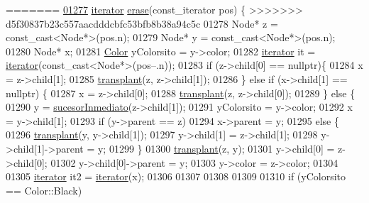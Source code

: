 \begin{DoxyCode}
=======
\hyperlink{classaed2_1_1map_ad8e796bf9c9c558e5ce6b61e116253fe_ad8e796bf9c9c558e5ce6b61e116253fe}{01277}     \hyperlink{classaed2_1_1iterator}{iterator} \hyperlink{classaed2_1_1map_ad8e796bf9c9c558e5ce6b61e116253fe_ad8e796bf9c9c558e5ce6b61e116253fe}{erase}(const\_iterator pos) \{
>>>>>>> d5f30837b23c557aacdddcbfc53bfb8b38a94c5c
01278         Node* z = \textcolor{keyword}{const\_cast<}Node*\textcolor{keyword}{>}(pos.n);
01279         Node* y = \textcolor{keyword}{const\_cast<}Node*\textcolor{keyword}{>}(pos.n);
01280         Node* x;
01281         \hyperlink{classaed2_1_1map_a6d62a415a4b9d320b30cada4ebcf9f5b_a6d62a415a4b9d320b30cada4ebcf9f5b}{Color} yColorsito = y->color;
01282         \hyperlink{classaed2_1_1iterator}{iterator} it = \hyperlink{classaed2_1_1iterator}{iterator}(const\_cast<Node*>(pos--.n));
01283         \textcolor{keywordflow}{if} (z->child[0] == \textcolor{keyword}{nullptr})\{
01284             x = z->child[1];
01285             \hyperlink{classaed2_1_1map_a98b9f200c64ce02dfb67902ee00e375a_a98b9f200c64ce02dfb67902ee00e375a}{transplant}(z, z->child[1]);
01286         \} \textcolor{keywordflow}{else} \textcolor{keywordflow}{if} (x->child[1] == \textcolor{keyword}{nullptr}) \{
01287             x = z->child[0];
01288             \hyperlink{classaed2_1_1map_a98b9f200c64ce02dfb67902ee00e375a_a98b9f200c64ce02dfb67902ee00e375a}{transplant}(z, z->child[0]);
01289         \} \textcolor{keywordflow}{else} \{
01290             y = \hyperlink{classaed2_1_1map_a51169c7d557dc5cf26eac59e6e5e6d98_a51169c7d557dc5cf26eac59e6e5e6d98}{sucesorInmediato}(z->child[1]);
01291             yColorsito = y->color;
01292             x = y->child[1];
01293             \textcolor{keywordflow}{if} (y->parent == z)
01294                 x->parent = y;
01295             \textcolor{keywordflow}{else} \{
01296                 \hyperlink{classaed2_1_1map_a98b9f200c64ce02dfb67902ee00e375a_a98b9f200c64ce02dfb67902ee00e375a}{transplant}(y, y->child[1]);
01297                 y->child[1] = z->child[1];
01298                 y->child[1]->parent = y;
01299             \}
01300             \hyperlink{classaed2_1_1map_a98b9f200c64ce02dfb67902ee00e375a_a98b9f200c64ce02dfb67902ee00e375a}{transplant}(z, y);
01301             y->child[0] = z->child[0];
01302             y->child[0]->parent = y;
01303             y->color = z->color;
01304 
01305             \hyperlink{classaed2_1_1iterator}{iterator} it2 = \hyperlink{classaed2_1_1iterator}{iterator}(x);
01306 
01307 
01308 
01309 
01310             \textcolor{keywordflow}{if} (yColorsito == Color::Black)

\end{DoxyCode}
